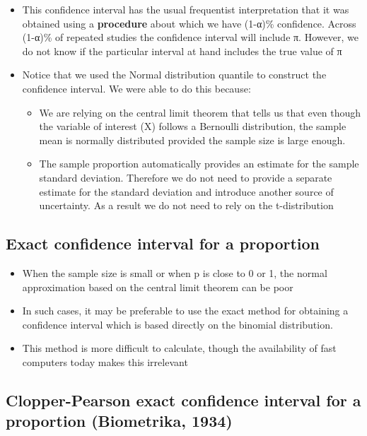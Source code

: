 \documentclass[
]{book}
\providecommand{\tightlist}{%
  \setlength{\itemsep}{0pt}\setlength{\parskip}{0pt}}
\begin{document}
\begin{itemize}
\tightlist
\item
  This confidence interval has the usual frequentist interpretation that it was obtained using a \textbf{procedure} about which we have (1-α)\% confidence. Across (1-α)\% of repeated studies the confidence interval will include π. However, we do not know if the particular interval at hand includes the true value of π
\item
  Notice that we used the Normal distribution quantile to construct the confidence interval. We were able to do this because:

  \begin{itemize}
  \tightlist
  \item
    We are relying on the central limit theorem that tells us that even though the variable of interest (X) follows a Bernoulli distribution, the sample mean is normally distributed provided the sample size is large enough.
  \item
    The sample proportion automatically provides an estimate for the sample standard deviation. Therefore we do not need to provide a separate estimate for the standard deviation and introduce another source of uncertainty. As a result we do not need to rely on the t-distribution
  \end{itemize}
\end{itemize}

\hypertarget{exact-confidence-interval-for-a-proportion}{%
\subsection{Exact confidence interval for a proportion}\label{exact-confidence-interval-for-a-proportion}}

\begin{itemize}
\tightlist
\item
  When the sample size is small or when p is close to 0 or 1, the normal approximation based on the central limit theorem can be poor
\item
  In such cases, it may be preferable to use the exact method for obtaining a confidence interval which is based directly on the binomial distribution.
\item
  This method is more difficult to calculate, though the availability of fast computers today makes this irrelevant
\end{itemize}

\hypertarget{clopper-pearson-exact-confidence-interval-for-a-proportion-biometrika-1934}{%
\subsection{Clopper-Pearson exact confidence interval for a proportion (Biometrika, 1934)}\label{clopper-pearson-exact-confidence-interval-for-a-proportion-biometrika-1934}}
\end{document}
